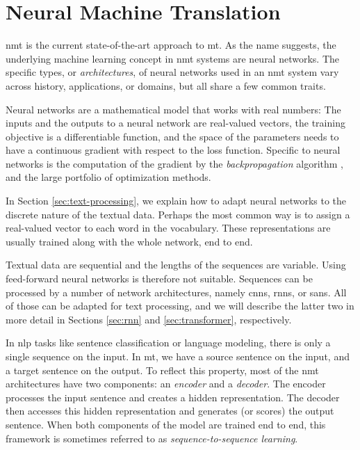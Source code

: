\chapter{Neural Machine Translation}
\label{chap:nmt}



\gls{nmt} is the current state-of-the-art approach to \gls{mt}. As the name
suggests, the underlying machine learning concept in \gls{nmt} systems are
neural networks. The specific types, or \emph{architectures}, of neural
networks used in an \gls{nmt} system vary across history, applications, or
domains, but all share a few common traits.

Neural networks are a mathematical model that works with real numbers: The
inputs and the outputs to a neural network are real-valued vectors, the
training objective is a differentiable function, and the space of the
parameters needs to have a continuous gradient with respect to the loss
function. Specific to neural networks is the computation of the gradient by the
\emph{backpropagation} algorithm , and the large portfolio of
optimization methods.

In Section \ref{sec:text-processing}, we explain how to adapt neural networks
to the discrete nature of the textual data. Perhaps the most common way is to
assign a real-valued vector to each word in the vocabulary. These
representations are usually trained along with the whole network, end to end.

Textual data are sequential and the lengths of the sequences are
variable. Using feed-forward neural networks is therefore not
suitable. Sequences can be processed by a number of network architectures,
namely \glspl{cnn}, \glspl{rnn}, or \glspl{san}. All of those can be adapted
for text processing, and we will describe the latter two in more detail in
Sections \ref{sec:rnn} and \ref{sec:transformer}, respectively.

In \acrshort{nlp} tasks like sentence classification or language modeling,
there is only a single sequence on the input. In \acrshort{mt}, we have a
source sentence on the input, and a target sentence on the output. To reflect
this property, most of the \gls{nmt} architectures have two components: an
\emph{encoder} and a \emph{decoder}. The encoder processes the input sentence
and creates a hidden representation. The decoder then accesses this hidden
representation and generates (or scores) the output sentence. When both
components of the model are trained end to end, this framework is sometimes
referred to as \emph{sequence-to-sequence learning}. 


